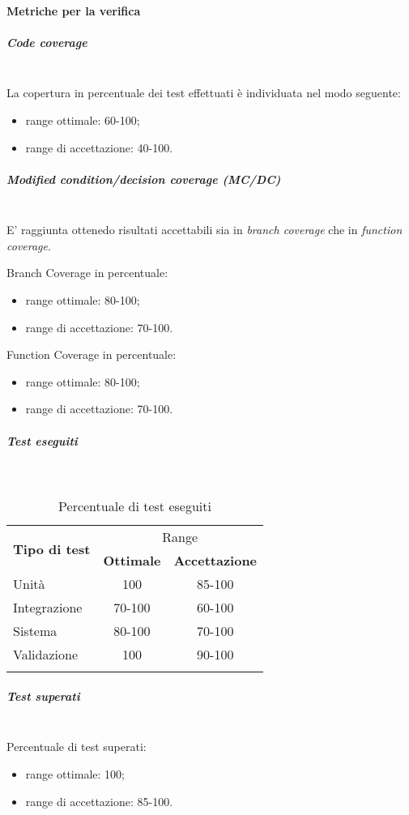 \paragraph{Metriche per la verifica}\mbox{}
\subparagraph{Code coverage}\mbox{}\\
La copertura in percentuale dei test effettuati è individuata nel modo seguente:
\begin{itemize}
	\item range ottimale: 60-100;
	\item range di accettazione: 40-100.
\end{itemize}

\subparagraph{Modified condition/decision coverage (MC/DC)}\mbox{}\\
E' raggiunta ottenedo risultati accettabili sia in \textit{branch coverage} che in \textit{function coverage}.

Branch Coverage in percentuale:
\begin{itemize}
	\item range ottimale: 80-100;
	\item range di accettazione: 70-100.
\end{itemize}

Function Coverage in percentuale:
\begin{itemize}
	\item range ottimale: 80-100;
	\item range di accettazione: 70-100.
\end{itemize}

\subparagraph{Test eseguiti}\mbox{}\\
\begin{longtable}[h]{|l|c|c|}
	\hline \multirow{2}{*}{\textbf{Tipo di test}} & \multicolumn{2}{c|}{Range} \\ \cline{2-3}
	& \multicolumn{1}{c|}{\textbf{Ottimale}} & \multicolumn{1}{c|}{\textbf{Accettazione}} \\ \hline
	\endfirsthead
	\hline Unità & 100 & 85-100 \\
	\hline Integrazione & 70-100 & 60-100 \\
	\hline Sistema & 80-100 & 70-100 \\
	\hline Validazione & 100 & 90-100 \\
	\hline
	\caption{Percentuale di test eseguiti}
\end{longtable}

\subparagraph{Test superati}\mbox{}\\
Percentuale di test superati:
\begin{itemize}
	\item range ottimale: 100;
	\item range di accettazione: 85-100.
\end{itemize}

